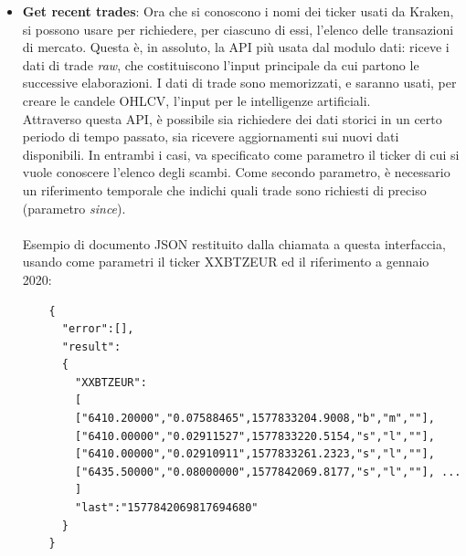 \documentclass[a4paper,12pt]{report}
\begin{document}
\begin{itemize}
	\item \textbf{Get recent trades}: Ora che si conoscono i nomi dei ticker usati da Kraken, si possono usare per richiedere, per ciascuno di essi, l'elenco delle transazioni di mercato. Questa è, in assoluto, la API più usata dal modulo dati: riceve i dati di trade \textit{raw}, che costituiscono l'input principale da cui partono le successive elaborazioni. I dati di trade sono memorizzati, e saranno usati, per creare le candele OHLCV, l'input per le intelligenze artificiali.\\
	Attraverso questa API, è possibile sia richiedere dei dati storici in un certo periodo di tempo passato, sia ricevere aggiornamenti sui nuovi dati disponibili. In entrambi i casi, va specificato come parametro il ticker di cui si vuole conoscere l'elenco degli scambi. Come secondo parametro, è necessario un riferimento temporale che indichi quali trade sono richiesti di preciso (parametro \textit{since}).\\~\\ Esempio di documento JSON restituito dalla chiamata a questa interfaccia, usando come parametri il ticker XXBTZEUR ed il riferimento a gennaio 2020:
	\begin{verbatim}
	{
	  "error":[],
	  "result":
	  {
	    "XXBTZEUR":
	    [
        ["6410.20000","0.07588465",1577833204.9008,"b","m",""],
        ["6410.00000","0.02911527",1577833220.5154,"s","l",""],
        ["6410.00000","0.02910911",1577833261.2323,"s","l",""],
        ["6435.50000","0.08000000",1577842069.8177,"s","l",""], ...
	    ]
	    "last":"1577842069817694680"
	  }
	}
	\end{verbatim}


\end{itemize}
\end{document}
